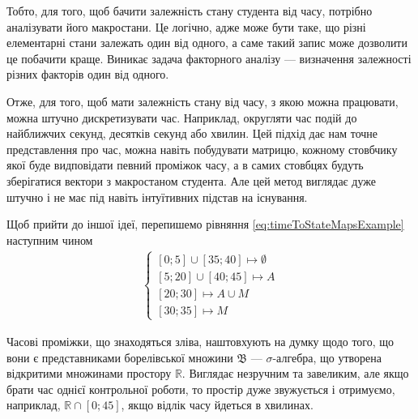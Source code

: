 Тобто, для того, щоб бачити залежність стану студента від часу,
потрібно аналізувати його макростани.
Це логічно, адже може бути таке, що різні елементарні стани залежать один від
одного, а саме такий запис може дозволити це побачити краще.
Виникає задача факторного аналізу --- визначення залежності різних факторів один
від одного.

Отже, для того, щоб мати залежність стану від часу, з якою можна працювати,
можна штучно дискретизувати час.
Наприклад, округляти час подій до найближчих секунд, десятків секунд або хвилин.
Цей підхід дає нам точне представлення про час, можна навіть побудувати матрицю,
кожному стовбчику якої буде видповідати певний проміжок часу, а в самих
стовбцях будуть зберігатися вектори з макростаном студента.
Але цей метод виглядає дуже штучно і не має під навіть інтуїтивних підстав на
існування.

Щоб прийти до іншої ідеї, перепишемо рівняння \eqref{eq:timeToStateMapsExample}
наступним чином
\begin{align}\label{eq:timeToStateMapsExampleShort}
  \begin{cases}
    \left[ 0; 5 \right] \cup \left[ 35; 40 \right] \mapsto \emptyset \\
    \left[ 5; 20 \right] \cup \left[ 40; 45 \right] \mapsto A \\
    \left[ 20; 30 \right] \mapsto A \cup M \\
    \left[ 30; 35 \right] \mapsto M
  \end{cases}
\end{align}

Часові проміжки, що знаходяться зліва, наштовхують на думку щодо того, що вони
є представниками борелівської множини $\mathfrak{B}$ --- $\sigma$-алгебра, що
утворена відкритими множинами простору $\mathbb{R}$.
Виглядає незручним та завеликим, але якщо брати час однієї контрольної роботи,
то простір дуже звужується і отримуємо, наприклад,
$\mathbb{R} \cap \left[ 0; 45 \right]$, якщо відлік часу йдеться в хвилинах.

